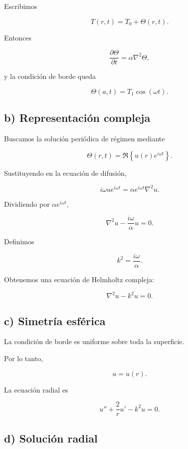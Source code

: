 \documentclass[11pt,spanish]{article}
\begin{document}
Escribimos

\[
T(r,t)=T_0+\Theta(r,t).
\]

Entonces

\[
\frac{\partial\Theta}{\partial t}
=
\alpha\nabla^2\Theta,
\]

y la condición de borde queda

\[
\Theta(a,t)=T_1\cos(\omega t).
\]


\subsection*{b) Representación compleja}

Buscamos la solución periódica de régimen mediante

\[
\Theta(r,t)
=
\Re\!\left\{
u(r)e^{i\omega t}
\right\}.
\]

Sustituyendo en la ecuación de difusión,

\[
i\omega u e^{i\omega t}
=
\alpha e^{i\omega t}\nabla^2u.
\]

Dividiendo por \(\alpha e^{i\omega t}\),

\[
\nabla^2u
-
\frac{i\omega}{\alpha}u
=
0.
\]

Definimos

\[
k^2=\frac{i\omega}{\alpha}.
\]

Obtenemos una ecuación de Helmholtz compleja:

\[
\boxed{
\nabla^2u-k^2u=0.
}
\]


\subsection*{c) Simetría esférica}

La condición de borde es uniforme sobre toda la superficie.

Por lo tanto,

\[
u=u(r).
\]

La ecuación radial es

\[
u''+\frac{2}{r}u'-k^2u=0.
\]


\subsection*{d) Solución radial}
\end{document}
